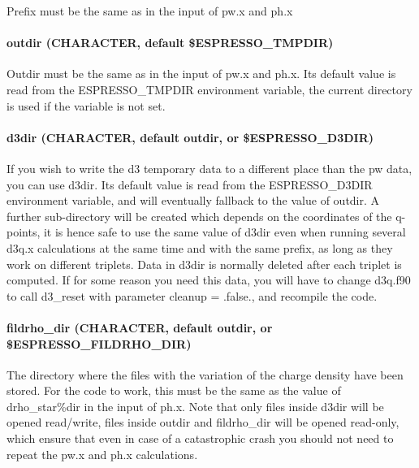 \documentclass[
]{article}
\begin{document}
Prefix must be the same as in the input of pw.x and ph.x

\hypertarget{outdir-character-default-espresso_tmpdir}{%
\paragraph{outdir (CHARACTER, default
\$ESPRESSO\_TMPDIR)}\label{outdir-character-default-espresso_tmpdir}}

Outdir must be the same as in the input of pw.x and ph.x. Its default
value is read from the ESPRESSO\_TMPDIR environment variable, the
current directory is used if the variable is not set.

\hypertarget{d3dir-character-default-outdir-or-espresso_d3dir}{%
\paragraph{d3dir (CHARACTER, default outdir, or
\$ESPRESSO\_D3DIR)}\label{d3dir-character-default-outdir-or-espresso_d3dir}}

If you wish to write the d3 temporary data to a different place than the
pw data, you can use d3dir. Its default value is read from the
ESPRESSO\_D3DIR environment variable, and will eventually fallback to
the value of outdir. A further sub-directory will be created which
depends on the coordinates of the q-points, it is hence safe to use the
same value of d3dir even when running several d3q.x calculations at the
same time and with the same prefix, as long as they work on different
triplets. Data in d3dir is normally deleted after each triplet is
computed. If for some reason you need this data, you will have to change
d3q.f90 to call d3\_reset with parameter cleanup = .false., and
recompile the code.

\hypertarget{fildrho_dir-character-default-outdir-or-espresso_fildrho_dir}{%
\paragraph{fildrho\_dir (CHARACTER, default outdir, or
\$ESPRESSO\_FILDRHO\_DIR)}\label{fildrho_dir-character-default-outdir-or-espresso_fildrho_dir}}

The directory where the files with the variation of the charge density
have been stored. For the code to work, this must be the same as the
value of drho\_star\%dir in the input of ph.x. Note that only files
inside d3dir will be opened read/write, files inside outdir and
fildrho\_dir will be opened read-only, which ensure that even in case of
a catastrophic crash you should not need to repeat the pw.x and ph.x
calculations.
\end{document}

